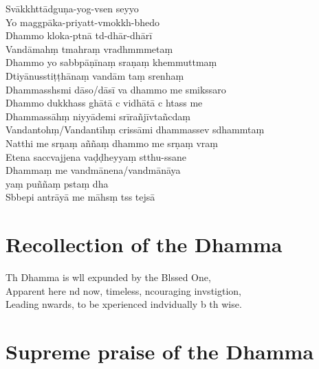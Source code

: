 Svākkhttādguṇa-yog-vsen seyyo\\
Yo maggpāka-priyatt-vmokkh-bhedo\\
Dhammo kloka-ptnā td-dhār-dhārī\\
Vandāmahṃ tmahraṃ vradhmmmetaṃ\\
Dhammo yo sabbpāṇīnaṃ sraṇaṃ khemmuttmaṃ\\
Dtiyānusstiṭṭhānaṃ vandām taṃ srenhaṃ\\
Dhammasshsmi dāso/dāsī va dhammo me smikssaro\\
Dhammo dukkhass ghātā c vidhātā c htass me\\
Dhammassāhṃ niyyādemi srīrañjīvtañcdaṃ\\
Vandantohṃ/Vandantīhṃ crissāmi dhammassev sdhammtaṃ\\
Natthi me srṇaṃ aññaṃ dhammo me srṇaṃ vraṃ\\
Etena saccvajjena vaḍḍheyyaṃ stthu-ssane\\
Dhammaṃ me vandmānena/vandmānāya\\
\vin yaṃ puññaṃ pstaṃ dha\\
Sbbepi antrāyā me māhsṃ tss tejsā

\clearpage

\chapter{Recollection of the Dhamma}%

\begin{leader}
\end{leader}

Th Dhamma is wll expunded by the Blssed One,\\
Apparent here nd now, timeless, ncouraging invstigtion,\\
Leading nwards, to be xperienced indvidually b th wise.

\chapter{Supreme praise of the Dhamma}%

